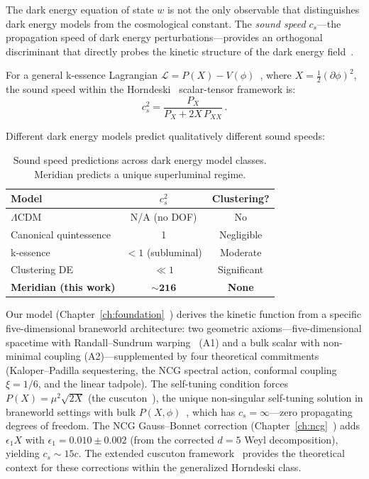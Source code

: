 The dark energy equation of state $w$ is not the only observable that distinguishes dark energy models from the cosmological constant. The \emph{sound speed} $c_s$---the propagation speed of dark energy perturbations---provides an orthogonal discriminant that directly probes the kinetic structure of the dark energy field~\cite{ch5:BeanDore2004,ch5:Hu2005}.

For a general k-essence Lagrangian $\mathcal{L} = P(X) - V(\phi)$~\cite{ch5:ArmendarizPicon2000}, where $X = \tfrac{1}{2}(\partial\phi)^2$, the sound speed within the Horndeski~\cite{ch5:Horndeski1974} scalar-tensor framework is:
\begin{equation}
  c_s^2 = \frac{P_X}{P_X + 2X\,P_{XX}}\,.
  \label{eq:5-1}
\end{equation}

Different dark energy models predict qualitatively different sound speeds:

\begin{table}[ht]
\centering
\caption{Sound speed predictions across dark energy model classes. Meridian predicts a unique superluminal regime.}
\label{tab:5-1}
\begin{tabular}{lcc}
\toprule
Model & $c_s^2$ & Clustering? \\
\midrule
$\Lambda$CDM & N/A (no DOF) & No \\
Canonical quintessence & 1 & Negligible \\
k-essence & $< 1$ (subluminal) & Moderate \\
Clustering DE & $\ll 1$ & Significant \\
\textbf{Meridian (this work)} & $\mathbf{\sim 216}$ & \textbf{None} \\
\bottomrule
\end{tabular}
\end{table}

Our model (Chapter~\ref{ch:foundation}~\cite{ch5:PaperI}) derives the kinetic function from a specific five-dimensional braneworld architecture: two geometric axioms---five-dimensional spacetime with Randall--Sundrum warping~\cite{ch5:RandallSundrum1999} (A1) and a bulk scalar with non-minimal coupling (A2)---supplemented by four theoretical commitments (Kaloper--Padilla sequestering, the NCG spectral action, conformal coupling $\xi = 1/6$, and the linear tadpole). The self-tuning condition forces $P(X) = \mu^2\sqrt{2X}$ (the cuscuton~\cite{ch5:Afshordi2007}), the unique non-singular self-tuning solution in braneworld settings with bulk $P(X,\phi)$~\cite{ch5:LacombeMukohyama2022}, which has $c_s = \infty$---zero propagating degrees of freedom. The NCG Gauss--Bonnet correction (Chapter~\ref{ch:ncg}~\cite{ch5:PaperIV}) adds $\epsilon_1 X$ with $\epsilon_1 = 0.010 \pm 0.002$ (from the corrected $d = 5$ Weyl decomposition), yielding $c_s \sim 15c$. The extended cuscuton framework~\cite{ch5:Kobayashi2011,ch5:Deffayet2010} provides the theoretical context for these corrections within the generalized Horndeski class.

